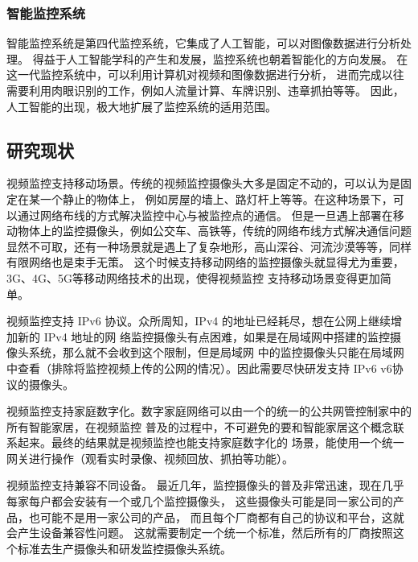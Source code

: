 \subsubsection{智能监控系统}
智能监控系统是第四代监控系统，它集成了人工智能，可以对图像数据进行分析处理。
得益于人工智能学科的产生和发展，监控系统也朝着智能化的方向发展。
在这一代监控系统中，可以利用计算机对视频和图像数据进行分析，
进而完成以往需要利用肉眼识别的工作，例如人流量计算、车牌识别、违章抓拍等等。
因此，人工智能的出现，极大地扩展了监控系统的适用范围。

\subsection{研究现状}
视频监控支持移动场景。传统的视频监控摄像头大多是固定不动的，可以认为是固定在某一个静止的物体上，
例如房屋的墙上、路灯杆上等等。在这种场景下，可以通过网络布线的方式解决监控中心与被监控点的通信。
但是一旦遇上部署在移动物体上的监控摄像头，例如公交车、高铁等，传统的网络布线方式解决通信问题
显然不可取，还有一种场景就是遇上了复杂地形，高山深谷、河流沙漠等等，同样有限网络也是束手无策。
这个时候支持移动网络的监控摄像头就显得尤为重要，3G、4G、5G等移动网络技术的出现，使得视频监控
支持移动场景变得更加简单。

视频监控支持 IPv6 协议。众所周知，IPv4 的地址已经耗尽，想在公网上继续增加新的 IPv4 地址的网
络监控摄像头有点困难，如果是在局域网中搭建的监控摄像头系统，那么就不会收到这个限制，但是局域网
中的监控摄像头只能在局域网中查看（排除将监控视频上传的公网的情况）。因此需要尽快研发支持 IPv6
v6协议的摄像头。

视频监控支持家庭数字化。数字家庭网络可以由一个的统一的公共网管控制家中的所有智能家居，在视频监控
普及的过程中，不可避免的要和智能家居这个概念联系起来。最终的结果就是视频监控也能支持家庭数字化的
场景，能使用一个统一网关进行操作（观看实时录像、视频回放、抓拍等功能）。

视频监控支持兼容不同设备。
最近几年，监控摄像头的普及非常迅速，现在几乎每家每户都会安装有一个或几个监控摄像头，
这些摄像头可能是同一家公司的产品，也可能不是用一家公司的产品，
而且每个厂商都有自己的协议和平台，这就会产生设备兼容性问题。
这就需要制定一个统一个标准，然后所有的厂商按照这个标准去生产摄像头和研发监控摄像头系统。


